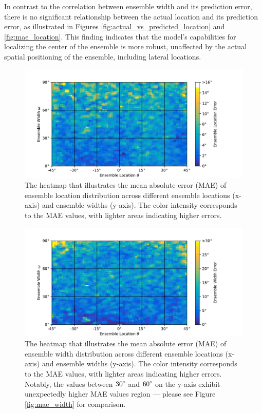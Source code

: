 \documentclass{article}
\begin{document}
In contrast to the correlation between ensemble width and its prediction error, there is no significant relationship between the actual location and its prediction error, as illustrated in Figures \ref{fig:actual_vs_predicted_location} and \ref{fig:mae_location}. This finding indicates that the model's capabilities for localizing the center of the ensemble is more robust, unaffected by the actual spatial positioning of the ensemble, including lateral locations.

\begin{figure}[ht]
  \centering
  \includegraphics[width=\linewidth]{../figures/map_mae_location.pdf}
  \caption{\label{fig:map_mae_location}The heatmap that illustrates the mean absolute error (MAE) of ensemble location distribution across different ensemble locations (x-axis) and ensemble widths (y-axis). The color intensity corresponds to the MAE values, with lighter areas indicating higher errors.}
\end{figure}

\begin{figure}[ht]
  \centering
  \includegraphics[width=\linewidth]{../figures/map_mae_width.pdf}
  \caption{\label{fig:map_mae_width}The heatmap that illustrates the mean absolute error (MAE) of ensemble width distribution across different ensemble locations (x-axis) and ensemble widths (y-axis). The color intensity corresponds to the MAE values, with lighter areas indicating higher errors. Notably, the values between $30\degree$ and $60\degree$ on the y-axis exhibit unexpectedly higher MAE values region --- please see Figure \ref{fig:mae_width} for comparison. }
\end{figure}
\end{document}
